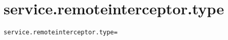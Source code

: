 \section{service.remoteinterceptor.type}
\label{configuration:ServiceRemoteinterceptorType}
\AvailableInCsharpOnly{\TODO}
\begin{lstlisting}[style=Props,caption={Usage example for \textit{service.remoteinterceptor.type}}]
service.remoteinterceptor.type=
\end{lstlisting}